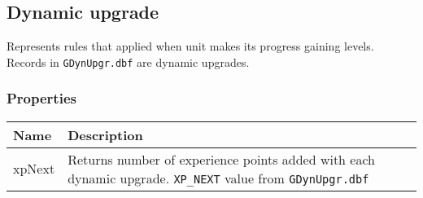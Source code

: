 \subsection{Dynamic upgrade}
\label{DynamicUpgrade}
Represents rules that applied when unit makes its progress gaining levels. Records in \texttt{GDynUpgr.dbf} are dynamic upgrades.
\subsubsection{Properties}
\begin{center}
\begin{tabularx}{\linewidth}{| l | X |}
\hline
\textbf{Name} & \textbf{Description} \\
\hline
xpNext & Returns number of experience points added with each dynamic upgrade. \texttt{XP\_NEXT} value from \texttt{GDynUpgr.dbf}\\
\hline
\end{tabularx}
\end{center}